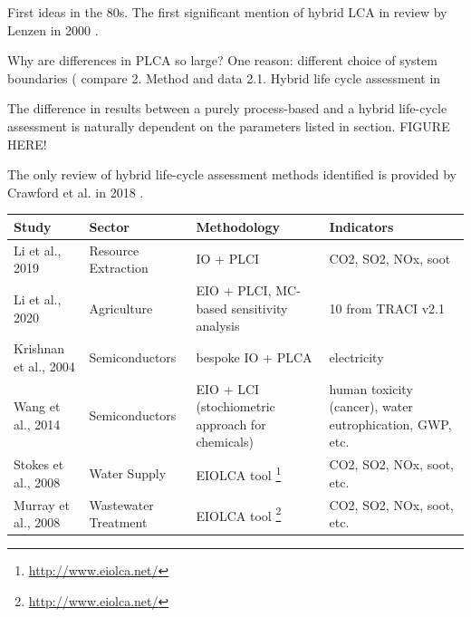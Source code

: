 \documentclass{article}
\begin{document}
        First ideas in the 80s. The first significant mention of hybrid LCA in review by Lenzen in 2000 \cite{lenzen_errors_2000}.
            
        Why are differences in PLCA so large? One reason: different choice of system boundaries ( compare 2. Method and data 2.1. Hybrid life cycle assessment in \cite{teh_hybrid_2017}
        
        The difference in results between a purely process-based and a hybrid life-cycle assessment is naturally dependent on the parameters listed in section. FIGURE HERE!
        
        The only review of hybrid life-cycle assessment methods identified is provided by Crawford et al. in 2018 \cite{crawford_hybrid_2018}. \cite{}
        
        \begin{table}[htbp]
            \centering
            \begin{tabularx}{\textwidth}{| X | X | X | X |}
                \hline
                    \textbf{Study} & \textbf{Sector} & \textbf{Methodology} & \textbf{Indicators} \\
                \hline
                    Li et al., 2019 \cite{li_economic_2019} & Resource Extraction & IO + PLCI & CO2, SO2, NOx, soot \\
                \hline
                    Li et al., 2020 \cite{li_life_2020} & Agriculture & EIO + PLCI, MC-based sensitivity analysis & 10 from TRACI v2.1 \\ %
                \hline
                    Krishnan et al., 2004 \cite{krishnan_using_2004} & Semiconductors & bespoke IO + PLCA & electricity \\
                \hline
                    Wang et al., 2014 \cite{wang_hybrid_2014} & Semiconductors & EIO + LCI (stochiometric approach for chemicals) & human toxicity (cancer), water eutrophication, GWP, etc. \\
                \hline
                    Stokes et al., 2008 \cite{stokes_energy_2009} & Water Supply & EIOLCA tool \footnote{\url{http://www.eiolca.net/}} & CO2, SO2, NOx, soot, etc. \\
                \hline
                    Murray et al., 2008 \cite{murray_hybrid_2008} & Wastewater Treatment & EIOLCA tool \footnote{\url{http://www.eiolca.net/}} & CO2, SO2, NOx, soot, etc. \\

\end{tabularx}
\end{table}
\end{document}
